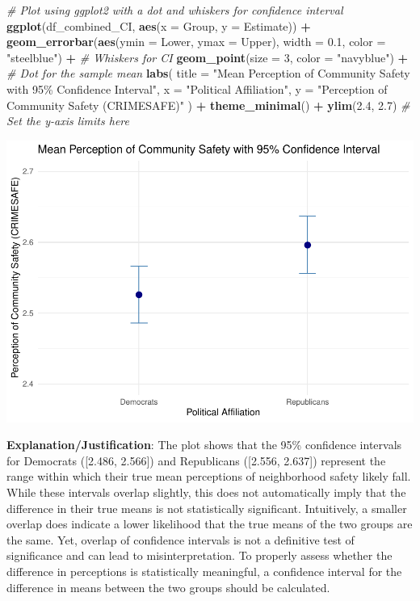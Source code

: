 \documentclass[
  11pt,
]{article}
\newenvironment{Shaded}{\begin{snugshade}}{\end{snugshade}}
\newcommand{\AttributeTok}[1]{\textcolor[rgb]{0.13,0.29,0.53}{#1}}
\newcommand{\CommentTok}[1]{\textcolor[rgb]{0.56,0.35,0.01}{\textit{#1}}}
\newcommand{\DecValTok}[1]{\textcolor[rgb]{0.00,0.00,0.81}{#1}}
\newcommand{\FloatTok}[1]{\textcolor[rgb]{0.00,0.00,0.81}{#1}}
\newcommand{\FunctionTok}[1]{\textcolor[rgb]{0.13,0.29,0.53}{\textbf{#1}}}
\newcommand{\NormalTok}[1]{#1}
\newcommand{\SpecialCharTok}[1]{\textcolor[rgb]{0.81,0.36,0.00}{\textbf{#1}}}
\newcommand{\StringTok}[1]{\textcolor[rgb]{0.31,0.60,0.02}{#1}}
\begin{document}
\begin{Shaded}
\begin{Highlighting}[]
\CommentTok{\# Plot using ggplot2 with a dot and whiskers for confidence interval}
\FunctionTok{ggplot}\NormalTok{(df\_combined\_CI, }\FunctionTok{aes}\NormalTok{(}\AttributeTok{x =}\NormalTok{ Group, }\AttributeTok{y =}\NormalTok{ Estimate)) }\SpecialCharTok{+}
  \FunctionTok{geom\_errorbar}\NormalTok{(}\FunctionTok{aes}\NormalTok{(}\AttributeTok{ymin =}\NormalTok{ Lower, }\AttributeTok{ymax =}\NormalTok{ Upper), }\AttributeTok{width =} \FloatTok{0.1}\NormalTok{, }\AttributeTok{color =} \StringTok{"steelblue"}\NormalTok{) }\SpecialCharTok{+}  \CommentTok{\# Whiskers for CI}
  \FunctionTok{geom\_point}\NormalTok{(}\AttributeTok{size =} \DecValTok{3}\NormalTok{, }\AttributeTok{color =} \StringTok{"navyblue"}\NormalTok{) }\SpecialCharTok{+}  \CommentTok{\# Dot for the sample mean}
  \FunctionTok{labs}\NormalTok{(}
    \AttributeTok{title =} \StringTok{"Mean Perception of Community Safety with 95\% Confidence Interval"}\NormalTok{,}
    \AttributeTok{x =} \StringTok{"Political Affiliation"}\NormalTok{,}
    \AttributeTok{y =} \StringTok{"Perception of Community Safety (CRIMESAFE)"}
\NormalTok{  ) }\SpecialCharTok{+}
  \FunctionTok{theme\_minimal}\NormalTok{() }\SpecialCharTok{+} 
  \FunctionTok{ylim}\NormalTok{(}\FloatTok{2.4}\NormalTok{, }\FloatTok{2.7}\NormalTok{)  }\CommentTok{\# Set the y{-}axis limits here}
\end{Highlighting}
\end{Shaded}

\includegraphics{Answers-PS3_files/figure-latex/q1-e-1.pdf}

\textbf{Explanation/Justification}: The plot shows that the 95\%
confidence intervals for Democrats ({[}2.486, 2.566{]}) and Republicans
({[}2.556, 2.637{]}) represent the range within which their true mean
perceptions of neighborhood safety likely fall. While these intervals
overlap slightly, this does not automatically imply that the difference
in their true means is not statistically significant. Intuitively, a
smaller overlap does indicate a lower likelihood that the true means of
the two groups are the same. Yet, overlap of confidence intervals is not
a definitive test of significance and can lead to misinterpretation. To
properly assess whether the difference in perceptions is statistically
meaningful, a confidence interval for the difference in means between
the two groups should be calculated.
\end{document}
